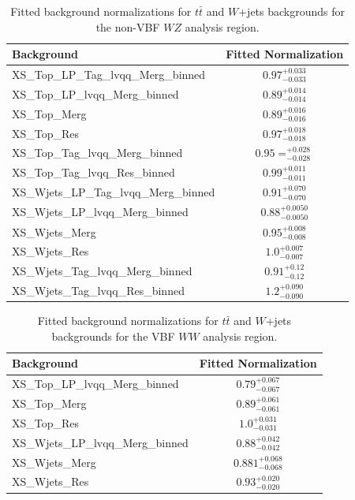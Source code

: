\begin{table}
\begin{tabular}{|l|c|}
\hline
Background & Fitted Normalization \\\hline
XS\_Top\_LP\_Tag\_lvqq\_Merg\_binned & $0.97^{+0.033}_{-0.033}$ \\\hline
XS\_Top\_LP\_lvqq\_Merg\_binned & $0.89^{+0.014}_{-0.014}$ \\\hline
XS\_Top\_Merg & $0.89^{+0.016}_{-0.016}$ \\\hline
XS\_Top\_Res & $0.97^{+0.018}_{-0.018}$ \\\hline
XS\_Top\_Tag\_lvqq\_Merg\_binned & $0.95=^{+0.028}_{-0.028}$ \\\hline
XS\_Top\_Tag\_lvqq\_Res\_binned & $0.99^{+0.011}_{-0.011}$ \\\hline
XS\_Wjets\_LP\_Tag\_lvqq\_Merg\_binned & $0.91^{+0.070}_{-0.070}$ \\\hline
XS\_Wjets\_LP\_lvqq\_Merg\_binned & $0.88^{+0.0050}_{-0.0050}$ \\\hline
XS\_Wjets\_Merg & $0.95^{+0.008}_{-0.008}$ \\\hline
XS\_Wjets\_Res & $1.0^{+0.007}_{-0.007}$ \\\hline
XS\_Wjets\_Tag\_lvqq\_Merg\_binned & $0.91^{+0.12}_{-0.12}$ \\\hline
XS\_Wjets\_Tag\_lvqq\_Res\_binned & $1.2^{+0.090}_{-0.090}$ \\\hline
\end{tabular}
\caption{Fitted background normalizations for $t\bar{t}$ and $W$+jets backgrounds for the non-VBF $WZ$ analysis region.}
\label{tbl:hvtwz_norm}
\end{table}


\begin{table}
\begin{tabular}{|l|c|}
\hline
Background & Fitted Normalization \\\hline
XS\_Top\_LP\_lvqq\_Merg\_binned & $0.79^{+0.067}_{-0.067}$ \\\hline
XS\_Top\_Merg & $0.89^{+0.061}_{-0.061}$ \\\hline
XS\_Top\_Res & $1.0^{+0.031}_{-0.031}$ \\\hline
XS\_Wjets\_LP\_lvqq\_Merg\_binned & $0.88^{+0.042}_{-0.042}$ \\\hline
XS\_Wjets\_Merg & $0.881^{+0.068}_{-0.068}$ \\\hline
XS\_Wjets\_Res & $0.93^{+0.020}_{-0.020}$ \\\hline
\end{tabular}
\caption{Fitted background normalizations for $t\bar{t}$ and $W$+jets backgrounds for the VBF $WW$ analysis region.}
\label{tbl:hvtwwvbf_norm}
\end{table}

